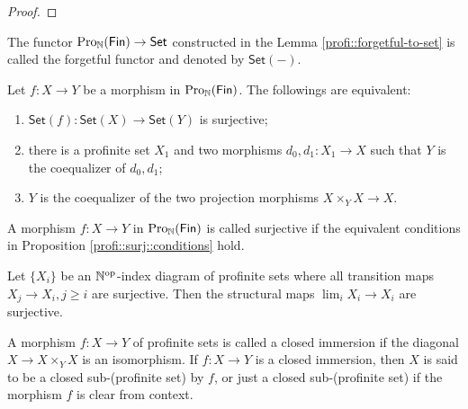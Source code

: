 \begin{proof}

\end{proof}

\begin{definition}
The functor $ \mathrm{Pro}_{\mathbb{N}}(\mathsf{Fin}) \to \mathsf{Set} $ constructed in the Lemma \ref{profi::forgetful-to-set} is called the forgetful functor
and denoted by $ \mathsf{Set}(-) $.
\end{definition}

\begin{proposition}
Let $ f: X\to Y $ be a morphism in $ \mathrm{Pro}_{\mathbb{N}}(\mathsf{Fin}) $. The followings are equivalent:
\begin{enumerate}
\item $ \mathsf{Set}(f): \mathsf{Set}(X)\to \mathsf{Set}(Y) $ is surjective;
\item there is a profinite set $ X _{1} $ and two morphisms $ d _{0}, d _{1}: X _{1}\to X $ such that $ Y $ is the coequalizer of $ d _{0}, d _{1} $;
\item $ Y $ is the coequalizer of the two projection morphisms $ X \times _{Y} X \to X $.
\end{enumerate}
\label{profi::surj::conditions}
\end{proposition}

\begin{definition}
A morphism $ f:X\to Y $ in $ \mathrm{Pro}_{\mathbb{N}}(\mathsf{Fin}) $ is called surjective if the equivalent conditions in Proposition \ref{profi::surj::conditions} hold.
\end{definition}

\begin{proposition}
Let $ \{X _{i}\} $ be an $ \mathbb{N} ^{\mathrm{op}}$-index diagram of profinite sets where all transition maps $ X _{j}\to X _{i},j\geq i $ are surjective.
Then the structural maps $ \lim _{i} X _{i} \to X _{i} $ are surjective.
\end{proposition}

\begin{definition}
A morphism $ f: X\to Y $ of profinite sets is called a closed immersion if the diagonal $ X\to X\times _{Y} X $ is an isomorphism.
If $ f:X\to Y $ is a closed immersion, then $ X $ is said to be a closed sub-(profinite set) by $ f $,
or just a closed sub-(profinite set) if the morphism $ f $ is clear from context.
\end{definition}


